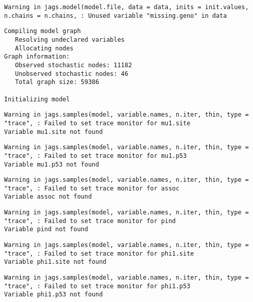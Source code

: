 \documentclass[12pt,twoside]{dukestatscithesis}
\theoremstyle{definition}
\theoremstyle{definition}
\theoremstyle{definition}
\theoremstyle{remark}
\begin{document}
\begin{verbatim}
Warning in jags.model(model.file, data = data, inits = init.values,
n.chains = n.chains, : Unused variable "missing.geno" in data
\end{verbatim}
\begin{verbatim}
Compiling model graph
   Resolving undeclared variables
   Allocating nodes
Graph information:
   Observed stochastic nodes: 11182
   Unobserved stochastic nodes: 46
   Total graph size: 59386

Initializing model
\end{verbatim}
\begin{verbatim}
Warning in jags.samples(model, variable.names, n.iter, thin, type = "trace", : Failed to set trace monitor for mu1.site
Variable mu1.site not found
\end{verbatim}
\begin{verbatim}
Warning in jags.samples(model, variable.names, n.iter, thin, type = "trace", : Failed to set trace monitor for mu1.p53
Variable mu1.p53 not found
\end{verbatim}
\begin{verbatim}
Warning in jags.samples(model, variable.names, n.iter, thin, type = "trace", : Failed to set trace monitor for assoc
Variable assoc not found
\end{verbatim}
\begin{verbatim}
Warning in jags.samples(model, variable.names, n.iter, thin, type = "trace", : Failed to set trace monitor for pind
Variable pind not found
\end{verbatim}
\begin{verbatim}
Warning in jags.samples(model, variable.names, n.iter, thin, type = "trace", : Failed to set trace monitor for phi1.site
Variable phi1.site not found
\end{verbatim}
\begin{verbatim}
Warning in jags.samples(model, variable.names, n.iter, thin, type = "trace", : Failed to set trace monitor for phi1.p53
Variable phi1.p53 not found
\end{verbatim}
\begin{Shaded}
\begin{Highlighting}[]
\StringTok{ }\NormalTok{(}\NormalTok{, }
\end{Highlighting}
\end{Shaded}
\end{document}
